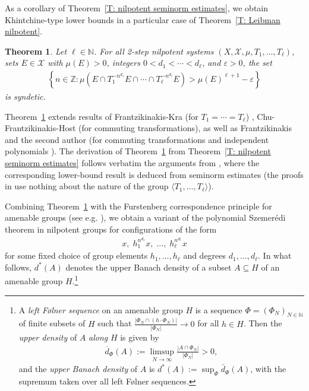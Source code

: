 \documentclass[11pt]{amsart}
\newtheorem{theorem}[lemma]{Theorem}
\theoremstyle{definition}
\newcommand{\N}{{\mathbb N}}
\newcommand{\Z}{{\mathbb Z}}
\newcommand{\CX}{{\mathcal X}}
\newcommand{\veps}{\varepsilon}
\newcommand{\1}{{\mathbf{1}}}
\newcommand{\rem}[1]{\left \{ #1 \right \}}
\begin{document}
As a corollary of Theorem~\ref{T: nilpotent seminorm estimates}, we obtain Khintchine-type lower bounds in a particular case of Theorem~\ref{T: Leibman nilpotent}.
\begin{theorem}\label{T: Khintchine}
    Let $\ell\in\N$. For all 2-step nilpotent systems $(X, \CX, \mu, T_1, \ldots, T_\ell)$, sets $E\in\CX$ with $\mu(E)>0$, integers $0<d_1< \cdots<d_\ell$, and $\veps>0$, the set
    \begin{align}
    \rem{n\in\Z\colon \mu(E\cap T_1^{-n^{d_1}}E\cap \cdots \cap T_\ell^{-n^{d_\ell}}E)>\mu(E)^{\ell+1}-\veps}
\end{align}
is syndetic.
\end{theorem}
Theorem~\ref{T: Khintchine} extends results of Frantzikinakis-Kra (for $T_1 = \cdots = T_\ell$) \cite{FrKr06}, Chu-Frantzikinakis-Host \cite{CFH11} (for commuting transformations), as well as Frantzikinakis and the second author (for commuting transformations and independent polynomials \cite{FrKu22a}). 
The derivation of Theorem~\ref{T: Khintchine} from Theorem~\ref{T: nilpotent seminorm estimates} follows verbatim the arguments from \cite[Section 7]{CFH11}, where the corresponding lower-bound result \cite[Theorem~1.3]{CFH11} is deduced from seminorm estimates \cite[Theorem~1.2]{CFH11} (the proofs in \cite[Section 7]{CFH11} use nothing about the nature of the group $\langle T_1, \ldots, T_\ell\rangle$). 


Combining Theorem~\ref{T: Khintchine} with the Furstenberg correspondence principle for amenable groups (see e.g. \cite[Theorem~2.3]{BFM21}), we obtain a variant of the polynomial Szemer\'edi theorem in nilpotent groups for configurations of the form
\begin{align*}
    x,\; h_1^{n^{d_1}} x,\; \ldots,\; h_\ell^{n^{d_\ell}}x
\end{align*}
for some fixed choice of group elements $h_1, \ldots, h_\ell$ and degrees $d_1, \ldots, d_\ell$.
In what follows, $d^*(A)$ denotes the upper Banach density of a subset $A\subseteq H$ of an amenable group $H$.\footnote{A \textit{left F{\o}lner sequence} on an amenable group $H$ is a sequence $\Phi = (\Phi_N)_{N\in\N}$ of finite subsets of $H$ such that $\frac{|\Phi_N\cap (h\cdot \Phi_N)|}{|\Phi_N|}\to 0$ for all $h\in H$. Then the \textit{upper density} of $A$ \textit{along} $H$ is given by \begin{align*}
        \overline{d}_\Phi(A):=\limsup_{N\to\infty}\frac{|A\cap \Phi_N|}{|\Phi_N|}>0,
    \end{align*}
    and the \textit{upper Banach density} of $A$ is $d^*(A):=\sup_{\Phi}\bar d_\Phi(A)$,  with the supremum taken over all left F{\o}lner sequences.}
\end{document}
